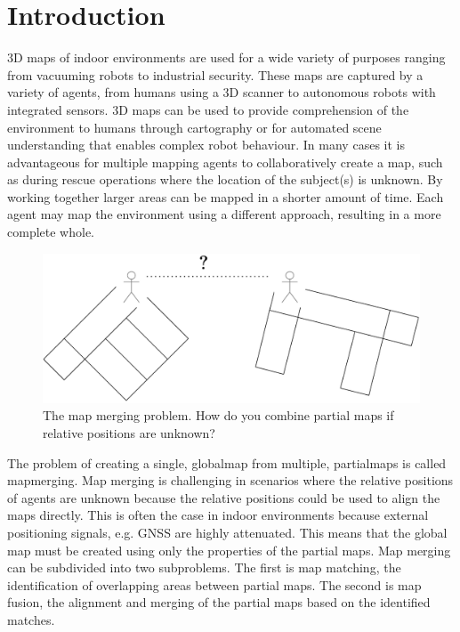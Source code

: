 
\section{Introduction}

3D \gls{map}s of indoor environments are used for a wide variety of purposes ranging from vacuuming robots to industrial security. These maps are captured by a variety of \gls{agent}s, from humans using a 3D scanner to autonomous robots with integrated sensors. 3D maps can be used to provide comprehension of the environment to humans through cartography or for automated scene understanding that enables complex robot behaviour. In many cases it is advantageous for multiple mapping agents to collaboratively create a map, such as during rescue operations where the location of the subject(s) is unknown. By working together larger areas can be mapped in a shorter amount of time. Each agent may map the environment using a different approach, resulting in a more complete whole.

\begin{figure}[h]
    \centering
    \includegraphics*[width=.7\textwidth]{./fig/overview_diagrams-Page-4.drawio.pdf}
    \caption{The map merging problem. How do you combine partial maps if relative positions are unknown?}
    \label{fig:map_merging}
\end{figure}

The problem of creating a single, \gls{globalmap} from multiple, \gls{partialmap}s is called \gls{mapmerging}. Map merging is challenging in scenarios where the relative positions of agents are unknown because the relative positions could be used to align the maps directly. This is often the case in indoor environments because external positioning signals, e.g. GNSS are highly attenuated. This means that the global map must be created using only the properties of the partial maps. Map merging can be subdivided into two subproblems. The first is map matching, the identification of overlapping areas between partial maps. The second is map fusion, the alignment and merging of the partial maps based on the identified matches. 

